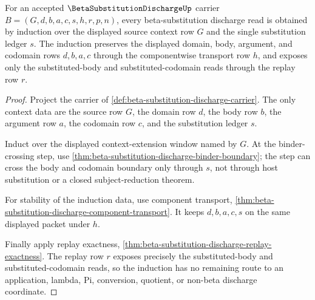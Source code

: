 \begin{theorem}
\label{thm:beta-substitution-discharge-context-induction}
For an accepted $\BetaSubstitutionDischargeUp$ carrier $B=(G,d,b,a,c,s,h,r,p,n)$, every beta-substitution discharge read is obtained by induction over the displayed source context row $G$ and the single substitution ledger $s$. The induction preserves the displayed domain, body, argument, and codomain rows $d,b,a,c$ through the componentwise transport row $h$, and exposes only the substituted-body and substituted-codomain reads through the replay row $r$.
\end{theorem}
\begin{proof}
Project the carrier of \autoref{def:beta-substitution-discharge-carrier}. The only context data are the source row $G$, the domain row $d$, the body row $b$, the argument row $a$, the codomain row $c$, and the substitution ledger $s$.

Induct over the displayed context-extension window named by $G$. At the binder-crossing step, use \autoref{thm:beta-substitution-discharge-binder-boundary}; the step can cross the body and codomain boundary only through $s$, not through host substitution or a closed subject-reduction theorem.

For stability of the induction data, use component transport, \autoref{thm:beta-substitution-discharge-component-transport}. It keeps $d,b,a,c,s$ on the same displayed packet under $h$.

Finally apply replay exactness, \autoref{thm:beta-substitution-discharge-replay-exactness}. The replay row $r$ exposes precisely the substituted-body and substituted-codomain reads, so the induction has no remaining route to an application, lambda, Pi, conversion, quotient, or non-beta discharge coordinate.
\end{proof}

